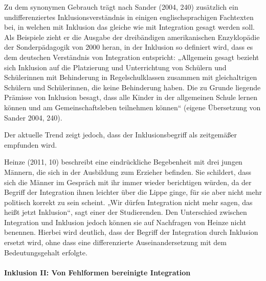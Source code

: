 Zu dem synonymen Gebrauch trägt nach Sander (2004, 240) zusätzlich ein undifferenziertes Inklusionsverständnis in einigen englischsprachigen Fachtexten bei, in welchen mit Inklusion das gleiche wie mit Integration gesagt werden soll. Als Beispiele zieht er die Ausgabe der dreibändigen amerikanischen Enzyklopädie der Sonderpädagogik von 2000 heran, in der Inklusion so definiert wird, dass es dem deutschen Verständnis von Integration entspricht: „Allgemein gesagt bezieht sich Inklusion auf die Platzierung und Unterrichtung von Schülern und Schülerinnen mit Behinderung in Regelschulklassen zusammen mit gleichaltrigen Schülern und Schülerinnen, die keine Behinderung haben. Die zu Grunde liegende Prämisse von Inklusion besagt, dass alle Kinder in der allgemeinen Schule lernen können und am Gemeinschaftsleben teilnehmen können“ (eigene Übersetzung von Sander 2004, 240). 
 
Der aktuelle Trend zeigt jedoch, dass der Inklusionsbegriff als zeitgemäßer empfunden wird. 

Heinze (2011, 10) beschreibt eine eindrückliche Begebenheit mit drei jungen Männern, die sich in der Ausbildung zum Erzieher befinden. Sie schildert, dass sich die Männer im Gespräch mit ihr immer wieder berichtigen würden, da der Begriff der Integration ihnen leichter über die Lippe ginge, für sie aber nicht mehr politisch korrekt zu sein scheint. „Wir dürfen Integration nicht mehr sagen, das heißt jetzt Inklusion“, sagt einer der Studierenden. Den Unterschied zwischen Integration und Inklusion jedoch können sie auf Nachfragen von Heinze nicht benennen. Hierbei wird deutlich, dass der Begriff der Integration durch Inklusion ersetzt wird, ohne dass eine differenzierte Auseinandersetzung mit dem Bedeutungsgehalt erfolgte. 

\paragraph{Inklusion II: Von Fehlformen bereinigte Integration} 

